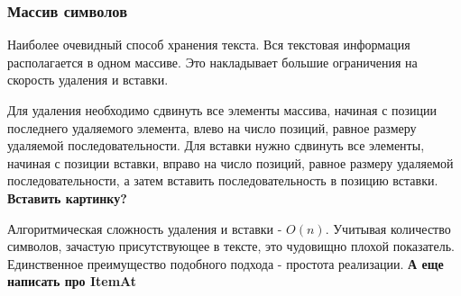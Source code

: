 \documentclass{fefu}
\begin{document}
			\subsubsection{Массив символов}
				\par Наиболее очевидный способ хранения текста. Вся текстовая информация
				располагается в одном массиве. Это накладывает большие ограничения на скорость
				удаления и вставки.
				\par Для удаления необходимо сдвинуть все элементы массива, начиная с позиции
				последнего удаляемого элемента, влево на число позиций, равное размеру
				удаляемой последовательности. Для вставки нужно сдвинуть все элементы, начиная
				с позиции вставки, вправо на число позиций, равное размеру удаляемой
				последовательности, а затем вставить последовательность в позицию вставки.
				\textbf{Вставить картинку?}
				\par Алгоритмическая сложность удаления и вставки - $O(n)$. Учитывая количество
				символов, зачастую присутствующее в тексте, это чудовищно плохой показатель.
				Единственное преимущество подобного подхода - простота реализации.
				\textbf{А еще написать про ItemAt}
\end{document}

